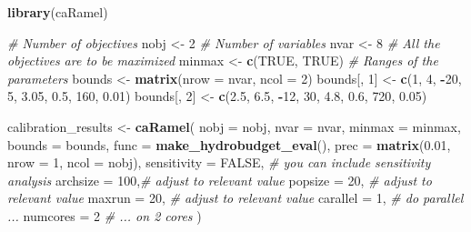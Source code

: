 \documentclass[
]{book}
\newenvironment{Shaded}{\begin{snugshade}}{\end{snugshade}}
\newcommand{\AttributeTok}[1]{\textcolor[rgb]{0.13,0.29,0.53}{#1}}
\newcommand{\CommentTok}[1]{\textcolor[rgb]{0.56,0.35,0.01}{\textit{#1}}}
\newcommand{\ConstantTok}[1]{\textcolor[rgb]{0.56,0.35,0.01}{#1}}
\newcommand{\DecValTok}[1]{\textcolor[rgb]{0.00,0.00,0.81}{#1}}
\newcommand{\FloatTok}[1]{\textcolor[rgb]{0.00,0.00,0.81}{#1}}
\newcommand{\FunctionTok}[1]{\textcolor[rgb]{0.13,0.29,0.53}{\textbf{#1}}}
\newcommand{\NormalTok}[1]{#1}
\newcommand{\OtherTok}[1]{\textcolor[rgb]{0.56,0.35,0.01}{#1}}
\newcommand{\SpecialCharTok}[1]{\textcolor[rgb]{0.81,0.36,0.00}{\textbf{#1}}}
\begin{document}
\begin{Shaded}
\begin{Highlighting}[]
\FunctionTok{library}\NormalTok{(caRamel)}

\CommentTok{\# Number of objectives}
\NormalTok{nobj }\OtherTok{\textless{}{-}} \DecValTok{2}
\CommentTok{\# Number of variables}
\NormalTok{nvar }\OtherTok{\textless{}{-}} \DecValTok{8}
\CommentTok{\# All the objectives are to be maximized}
\NormalTok{minmax }\OtherTok{\textless{}{-}} \FunctionTok{c}\NormalTok{(}\ConstantTok{TRUE}\NormalTok{, }\ConstantTok{TRUE}\NormalTok{)}
\CommentTok{\# Ranges of the parameters}
\NormalTok{bounds }\OtherTok{\textless{}{-}} \FunctionTok{matrix}\NormalTok{(}\AttributeTok{nrow =}\NormalTok{ nvar, }\AttributeTok{ncol =} \DecValTok{2}\NormalTok{)}
\NormalTok{bounds[, }\DecValTok{1}\NormalTok{] }\OtherTok{\textless{}{-}} \FunctionTok{c}\NormalTok{(}\DecValTok{1}\NormalTok{, }\DecValTok{4}\NormalTok{, }\SpecialCharTok{{-}}\DecValTok{20}\NormalTok{, }\DecValTok{5}\NormalTok{, }\FloatTok{3.05}\NormalTok{, }\FloatTok{0.5}\NormalTok{, }\DecValTok{160}\NormalTok{, }\FloatTok{0.01}\NormalTok{)}
\NormalTok{bounds[, }\DecValTok{2}\NormalTok{] }\OtherTok{\textless{}{-}} \FunctionTok{c}\NormalTok{(}\FloatTok{2.5}\NormalTok{, }\FloatTok{6.5}\NormalTok{, }\SpecialCharTok{{-}}\DecValTok{12}\NormalTok{, }\DecValTok{30}\NormalTok{, }\FloatTok{4.8}\NormalTok{, }\FloatTok{0.6}\NormalTok{, }\DecValTok{720}\NormalTok{, }\FloatTok{0.05}\NormalTok{)}

\NormalTok{calibration\_results }\OtherTok{\textless{}{-}} \FunctionTok{caRamel}\NormalTok{(}
  \AttributeTok{nobj =}\NormalTok{ nobj,}
  \AttributeTok{nvar =}\NormalTok{ nvar,}
  \AttributeTok{minmax =}\NormalTok{  minmax,}
  \AttributeTok{bounds =}\NormalTok{ bounds,}
  \AttributeTok{func =} \FunctionTok{make\_hydrobudget\_eval}\NormalTok{(),}
  \AttributeTok{prec =} \FunctionTok{matrix}\NormalTok{(}\FloatTok{0.01}\NormalTok{, }\AttributeTok{nrow =} \DecValTok{1}\NormalTok{, }\AttributeTok{ncol =}\NormalTok{ nobj),}
  \AttributeTok{sensitivity =} \ConstantTok{FALSE}\NormalTok{, }\CommentTok{\# you can include sensitivity analysis}
  \AttributeTok{archsize =} \DecValTok{100}\NormalTok{,}\CommentTok{\# adjust to relevant value}
  \AttributeTok{popsize =} \DecValTok{20}\NormalTok{,  }\CommentTok{\# adjust to relevant value}
  \AttributeTok{maxrun =} \DecValTok{20}\NormalTok{,   }\CommentTok{\# adjust to relevant value}
  \AttributeTok{carallel =} \DecValTok{1}\NormalTok{,  }\CommentTok{\# do parallel ...}
  \AttributeTok{numcores =} \DecValTok{2}   \CommentTok{\# ... on 2 cores}
\NormalTok{)}
\end{Highlighting}
\end{Shaded}
\end{document}
